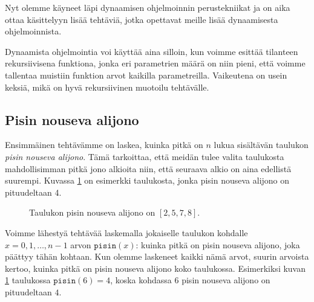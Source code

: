 Nyt olemme käyneet läpi dynaamisen ohjelmoinnin perustekniikat
ja on aika ottaa käsittelyyn lisää tehtäviä,
jotka opettavat meille lisää dynaamisesta ohjelmoinnista.

Dynaamista ohjelmointia voi käyttää aina silloin,
kun voimme esittää tilanteen rekursiivisena funktiona,
jonka eri parametrien määrä on niin pieni, että voimme
tallentaa muistiin funktion arvot kaikilla parametreilla.
Vaikeutena on usein keksiä, mikä on hyvä rekursiivinen
muotoilu tehtävälle.

\subsection{Pisin nouseva alijono}

Ensimmäinen tehtävämme on laskea, kuinka pitkä on
$n$ lukua sisältävän taulukon \emph{pisin nouseva alijono}.
Tämä tarkoittaa, että meidän tulee valita taulukosta
mahdollisimman pitkä jono alkioita niin,
että seuraava alkio on aina edellistä suurempi.
Kuvassa \ref{fig:pisnou} on esimerkki taulukosta,
jonka pisin nouseva alijono on pituudeltaan 4.

\begin{figure}
\center
{}
\caption{Taulukon pisin nouseva alijono on $[2,5,7,8]$.}
\label{fig:pisnou}
\end{figure}

Voimme lähestyä tehtävää laskemalla jokaiselle taulukon
kohdalle $x=0,1,\dots,n-1$ arvon $\texttt{pisin}(x)$:
kuinka pitkä on pisin nouseva alijono, joka päättyy tähän kohtaan.
Kun olemme laskeneet kaikki nämä arvot, suurin arvoista kertoo,
kuinka pitkä on pisin nouseva alijono koko taulukossa.
Esimerkiksi kuvan \ref{fig:pisnou} taulukossa $\texttt{pisin}(6)=4$,
koska kohdassa $6$ pisin nouseva alijono on pituudeltaan $4$.

